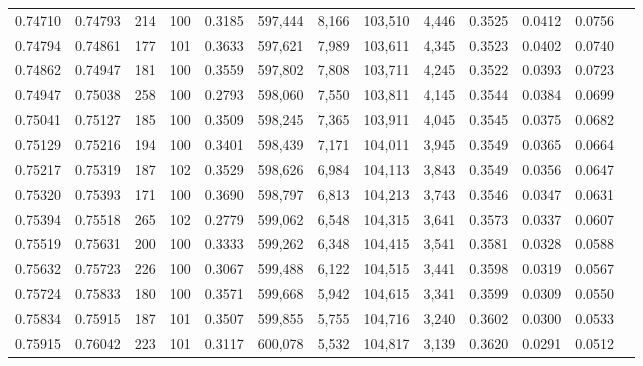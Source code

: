 \begin{tabular}{rrrrrrrrrrrrr}
0.74710 & 0.74793 &   214 & 100 &                                     0.3185 & 597,444 &   8,166 & 103,510 &   4,446 & 0.3525 & 0.0412 & 0.0756 \\
0.74794 & 0.74861 &   177 & 101 &                                     0.3633 & 597,621 &   7,989 & 103,611 &   4,345 & 0.3523 & 0.0402 & 0.0740 \\
0.74862 & 0.74947 &   181 & 100 &                                     0.3559 & 597,802 &   7,808 & 103,711 &   4,245 & 0.3522 & 0.0393 & 0.0723 \\
0.74947 & 0.75038 &   258 & 100 &                                     0.2793 & 598,060 &   7,550 & 103,811 &   4,145 & 0.3544 & 0.0384 & 0.0699 \\
0.75041 & 0.75127 &   185 & 100 &                                     0.3509 & 598,245 &   7,365 & 103,911 &   4,045 & 0.3545 & 0.0375 & 0.0682 \\
0.75129 & 0.75216 &   194 & 100 &                                     0.3401 & 598,439 &   7,171 & 104,011 &   3,945 & 0.3549 & 0.0365 & 0.0664 \\
0.75217 & 0.75319 &   187 & 102 &                                     0.3529 & 598,626 &   6,984 & 104,113 &   3,843 & 0.3549 & 0.0356 & 0.0647 \\
0.75320 & 0.75393 &   171 & 100 &                                     0.3690 & 598,797 &   6,813 & 104,213 &   3,743 & 0.3546 & 0.0347 & 0.0631 \\
0.75394 & 0.75518 &   265 & 102 &                                     0.2779 & 599,062 &   6,548 & 104,315 &   3,641 & 0.3573 & 0.0337 & 0.0607 \\
0.75519 & 0.75631 &   200 & 100 &                                     0.3333 & 599,262 &   6,348 & 104,415 &   3,541 & 0.3581 & 0.0328 & 0.0588 \\
0.75632 & 0.75723 &   226 & 100 &                                     0.3067 & 599,488 &   6,122 & 104,515 &   3,441 & 0.3598 & 0.0319 & 0.0567 \\
0.75724 & 0.75833 &   180 & 100 &                                     0.3571 & 599,668 &   5,942 & 104,615 &   3,341 & 0.3599 & 0.0309 & 0.0550 \\
0.75834 & 0.75915 &   187 & 101 &                                     0.3507 & 599,855 &   5,755 & 104,716 &   3,240 & 0.3602 & 0.0300 & 0.0533 \\
0.75915 & 0.76042 &   223 & 101 &                                     0.3117 & 600,078 &   5,532 & 104,817 &   3,139 & 0.3620 & 0.0291 & 0.0512 \\

\end{tabular}
